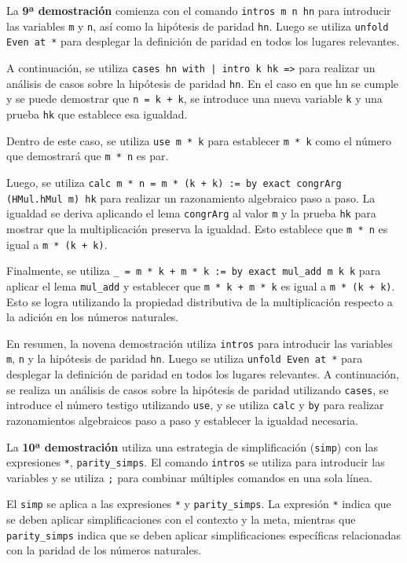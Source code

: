 La \textbf{9ª demostración} comienza con el comando \texttt{intros m n hn} para
introducir las variables \texttt{m} y \texttt{n}, así como la hipótesis de paridad
\texttt{hn}. Luego se utiliza \texttt{unfold Even at *} para desplegar la definición
de paridad en todos los lugares relevantes.

A continuación, se utiliza \texttt{cases hn with | intro k hk =>} para realizar
un análisis de casos sobre la hipótesis de paridad \texttt{hn}. En el caso en
que hn se cumple y se puede demostrar que \texttt{n = k + k}, se introduce una
nueva variable \texttt{k} y una prueba \texttt{hk} que establece esa igualdad.

Dentro de este caso, se utiliza \texttt{use m * k} para establecer \texttt{m * k} como
el número que demostrará que \texttt{m * n} es par.

Luego, se utiliza \texttt{calc m * n = m * (k + k) := by exact congrArg (HMul.hMul m) hk}
para realizar un razonamiento algebraico paso a
paso. La igualdad se deriva aplicando el lema \texttt{congrArg} al valor \texttt{m} y
la prueba \texttt{hk} para mostrar que la multiplicación preserva la
igualdad. Esto establece que \texttt{m * n} es igual a \texttt{m * (k + k)}.

Finalmente, se utiliza \texttt{\_ = m * k + m * k := by exact mul\_add m k k}
para aplicar el lema \texttt{mul\_add} y establecer que \texttt{m * k + m * k} es igual
a \texttt{m * (k + k)}. Esto se logra utilizando la propiedad distributiva de
la multiplicación respecto a la adición en los números naturales.

En resumen, la novena demostración utiliza \texttt{intros} para introducir las
variables \texttt{m}, \texttt{n} y la hipótesis de paridad \texttt{hn}. Luego se utiliza
\texttt{unfold Even at *} para desplegar la definición de paridad en todos los
lugares relevantes. A continuación, se realiza un análisis de casos
sobre la hipótesis de paridad utilizando \texttt{cases}, se introduce el número
testigo utilizando \texttt{use}, y se utiliza \texttt{calc} y \texttt{by} para realizar
razonamientos algebraicos paso a paso y establecer la igualdad
necesaria.

La \textbf{10ª demostración} utiliza una estrategia de simplificación (\texttt{simp})
con las expresiones \texttt{*}, \texttt{parity\_simps}. El comando \texttt{intros} se utiliza
para introducir las variables y se utiliza \texttt{;} para combinar múltiples
comandos en una sola línea.

El \texttt{simp} se aplica a las expresiones \texttt{*} y \texttt{parity\_simps}. La expresión
\texttt{*} indica que se deben aplicar simplificaciones con el contexto y la
meta, mientras que \texttt{parity\_simps} indica que se deben aplicar
simplificaciones específicas relacionadas con la paridad de los números
naturales.

